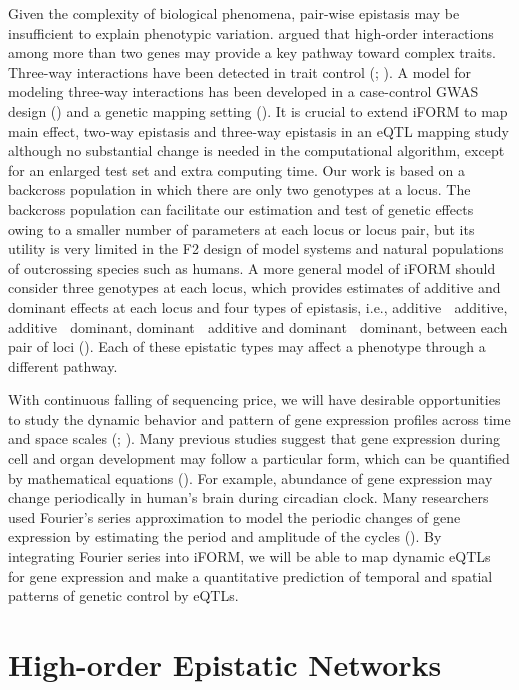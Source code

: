 \documentclass[11pt,]{book}
\theoremstyle{definition}
\theoremstyle{definition}
\theoremstyle{remark}
\begin{document}
Given the complexity of biological phenomena, pair-wise epistasis may be
insufficient to explain phenotypic variation.
\cite{imielinski2008exploiting} argued that high-order interactions
among more than two genes may provide a key pathway toward complex
traits. Three-way interactions have been detected in trait control
(\cite{mcmullen1998quantitative}; \cite{stich2007power}). A model for
modeling three-way interactions has been developed in a case-control
GWAS design (\cite{wang2010general}) and a genetic mapping setting
(\cite{pang2013statistical}). It is crucial to extend iFORM to map main
effect, two-way epistasis and three-way epistasis in an eQTL mapping
study although no substantial change is needed in the computational
algorithm, except for an enlarged test set and extra computing time. Our
work is based on a backcross population in which there are only two
genotypes at a locus. The backcross population can facilitate our
estimation and test of genetic effects owing to a smaller number of
parameters at each locus or locus pair, but its utility is very limited
in the F2 design of model systems and natural populations of outcrossing
species such as humans. A more general model of iFORM should consider
three genotypes at each locus, which provides estimates of additive and
dominant effects at each locus and four types of epistasis, i.e.,
additive  additive, additive  dominant, dominant  additive and
dominant  dominant, between each pair of loci
(\cite{kempthorne1968correlation}). Each of these epistatic types may
affect a phenotype through a different pathway.

With continuous falling of sequencing price, we will have desirable
opportunities to study the dynamic behavior and pattern of gene
expression profiles across time and space scales
(\cite{vinuela2010genome}; \cite{ackermann2013impact}). Many previous
studies suggest that gene expression during cell and organ development
may follow a particular form, which can be quantified by mathematical
equations (\cite{kim2010wavelet}). For example, abundance of gene
expression may change periodically in human's brain during circadian
clock. Many researchers used Fourier's series approximation to model the
periodic changes of gene expression by estimating the period and
amplitude of the cycles (\cite{li2013using}). By integrating Fourier
series into iFORM, we will be able to map dynamic eQTLs for gene
expression and make a quantitative prediction of temporal and spatial
patterns of genetic control by eQTLs.

\chapter{High-order Epistatic Networks}\label{highorder}
\end{document}
